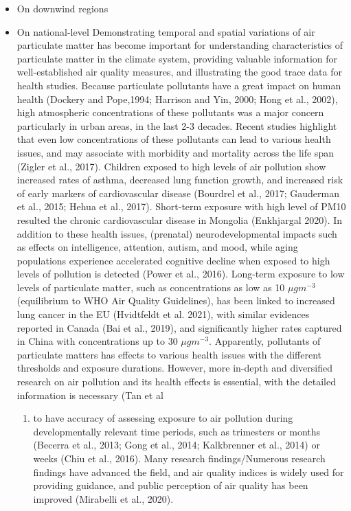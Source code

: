 \documentclass[
  11pt,
]{article}
\providecommand{\tightlist}{%
  \setlength{\itemsep}{0pt}\setlength{\parskip}{0pt}}
\begin{document}
\begin{itemize}
\tightlist
\item
  On downwind regions
\item
  On national-level Demonstrating temporal and spatial variations of air
  particulate matter has become important for understanding
  characteristics of particulate matter in the climate system, providing
  valuable information for well-established air quality measures, and
  illustrating the good trace data for health studies. Because
  particulate pollutants have a great impact on human health (Dockery
  and Pope,1994; Harrison and Yin, 2000; Hong et al., 2002), high
  atmospheric concentrations of these pollutants was a major concern
  particularly in urban areas, in the last 2-3 decades. Recent studies
  highlight that even low concentrations of these pollutants can lead to
  various health issues, and may associate with morbidity and mortality
  across the life span (Zigler et al., 2017). Children exposed to high
  levels of air pollution show increased rates of asthma, decreased lung
  function growth, and increased risk of early markers of cardiovascular
  disease (Bourdrel et al., 2017; Gauderman et al., 2015; Hehua et al.,
  2017). Short-term exposure with high level of PM10 resulted the
  chronic cardiovascular disease in Mongolia (Enkhjargal 2020). In
  addition to these health issues, (prenatal) neurodevelopmental impacts
  such as effects on intelligence, attention, autism, and mood, while
  aging populations experience accelerated cognitive decline when
  exposed to high levels of pollution is detected (Power et al., 2016).
  Long-term exposure to low levels of particulate matter, such as
  concentrations as low as 10 \(\mu g m^{-3}\) (equilibrium to WHO Air
  Quality Guidelines), has been linked to increased lung cancer in the
  EU (Hvidtfeldt et al. 2021), with similar evidences reported in Canada
  (Bai et al., 2019), and significantly higher rates captured in China
  with concentrations up to 30 \(\mu g m^{-3}\). Apparently, pollutants
  of particulate matters has effects to various health issues with the
  different thresholds and exposure durations. However, more in-depth
  and diversified research on air pollution and its health effects is
  essential, with the detailed information is necessary (Tan et al

  \begin{enumerate}
  \def\labelenumi{\arabic{enumi})}
  \setcounter{enumi}{2020}
  \tightlist
  \item
    to have accuracy of assessing exposure to air pollution during
    developmentally relevant time periods, such as trimesters or months
    (Becerra et al., 2013; Gong et al., 2014; Kalkbrenner et al., 2014)
    or weeks (Chiu et al., 2016). Many research findings/Numerous
    research findings have advanced the field, and air quality indices
    is widely used for providing guidance, and public perception of air
    quality has been improved (Mirabelli et al., 2020).
  \end{enumerate}
\end{itemize}
\end{document}
